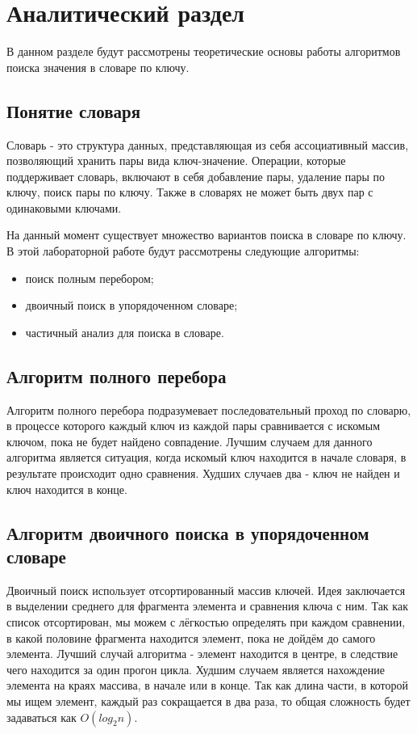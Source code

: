 \chapter{Аналитический раздел}
В данном разделе будут рассмотрены теоретические основы работы алгоритмов поиска значения в словаре по ключу.

\section{Понятие словаря}
Словарь - это структура данных, представляющая из себя ассоциативный массив, позволяющий хранить пары вида ключ-значение. Операции, которые поддерживает словарь, включают в себя добавление пары, удаление пары по ключу, поиск пары по ключу. Также в словарях не может быть двух пар с одинаковыми ключами. 

На данный момент существует множество вариантов поиска в словаре по ключу. В этой лабораторной работе будут рассмотрены следующие алгоритмы:
\begin{itemize}
	\item поиск полным перебором;
	\item двоичный поиск в упорядоченном словаре;
	\item частичный анализ для поиска в словаре.
\end{itemize}

\section{Алгоритм полного перебора}
Алгоритм полного перебора подразумевает последовательный проход по словарю, в процессе которого каждый ключ из каждой пары сравнивается с искомым ключом, пока не будет найдено совпадение. Лучшим случаем для данного алгоритма является ситуация, когда искомый ключ находится в начале словаря, в результате происходит одно сравнения. Худших случаев два - ключ не найден и ключ находится в конце. 

\section{Алгоритм двоичного поиска в упорядоченном словаре}
Двоичный поиск использует отсортированный массив ключей. Идея заключается в выделении среднего для фрагмента элемента и сравнения ключа с ним. Так как список отсортирован, мы можем с лёгкостью определять при каждом сравнении, в какой половине фрагмента находится элемент, пока не дойдём до самого элемента. Лучший случай алгоритма - элемент находится в центре, в следствие чего находится за один прогон цикла. Худшим случаем является нахождение элемента на краях массива, в начале или в конце. Так как длина части, в которой мы ищем элемент, каждый раз сокращается в два раза, то общая сложность будет задаваться как $O(log_{2}n)$.

